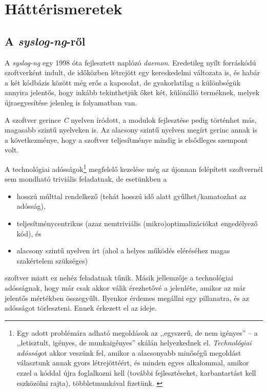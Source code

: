 \chapter{Háttérismeretek}

\section{A \emph{syslog-ng}-ről}

A \emph{syslog-ng} egy 1998 óta fejlesztett naplózó \emph{daemon}. Eredetileg nyílt forráskódú
szoftverként indult, de időközben létrejött egy kereskedelmi változata is, és habár a két kódbázis
között még erős a kapcsolat, de gyakorlatilag a különbségük annyira jelentős, hogy inkább
tekinthetjük őket két, különálló terméknek, melyek újraegyesítése jelenleg is folyamatban van.

A szoftver gerince \emph{C} nyelven íródott, a modulok fejlesztése pedig történhet más, magasabb
szintű nyelveken is. Az alacsony szintű nyelven megírt gerinc annak is a következménye, hogy
a szoftver teljesítménye mindig is elsődleges szempont volt.

A technológiai adósságok\footnote{Egy adott problémára adható megoldások az ,,egyszerű, de nem
    igényes'' -- a ,,letisztult, igényes, de munkaigényes'' skálán helyezkednek el.
    \emph{Technológiai adósság}ot akkor veszünk fel, amikor a alacsonyabb minőségű megoldást
    választunk annak gyors létrejöttéért, és minden egyes alkalommal, amikor ezzel a kóddal újra
foglalkozni kell (további fejlesztéseket, karbantartást kell eszközölni rajta), többletmunkával
fizetünk. \cite{magnusson2014technology}} megfelelő kezelése még az újonnan felépített szoftvernél
sem mondható triviális feladatnak, de esetünkben a
\begin{itemize}
    \item hosszú múlttal rendelkező (tehát hosszú idő alatt gyűlhet/kamatozhat az adósság),
    \item teljesítménycentrikus (azaz nemtriviális (mikro)optimalizációkat engedélyező kód), és
    \item alacsony szintű nyelven írt (ahol a helyes működés eléréséhez magas szakértelem szükséges)
\end{itemize}
szoftver miatt ez nehéz feladatnak tűnik. Másik jellemzője a technológiai adósságnak, hogy már csak
akkor válik érezhetővé a jelenléte, amikor az már jelentős mértékben összegyűlt.  Ilyenkor érdemes
megállni egy pillanatra, és az adósságot törleszteni. Ennek érkezett el az ideje.




